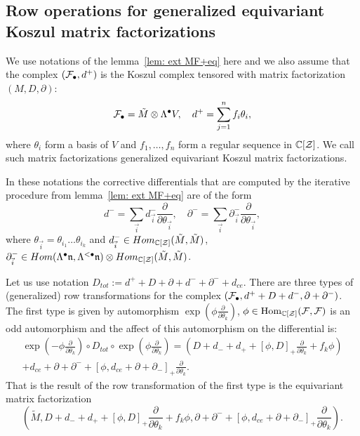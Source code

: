 \subsection{Row operations for generalized equivariant Koszul matrix factorizations}\label{ssec: row ops}
We use notations of the lemma~\ref{lem: ext MF+eq}
here and we also assume that the complex $(\mathcal{F}_\bullet,d^+)$ is the Koszul complex tensored with matrix factorization $(M,D,\partial)$:
$$\mathcal{F}_\bullet=\tilde{M} \otimes \Lambda^\bullet V, \quad d^+=\sum_{j=1}^n f_i\theta_i,$$
where $\theta_i$ form a basis of $V$ and $f_1,\dots,f_n$ form a regular sequence in $\mathbb{C}[\mathcal{Z}]$.
We call such matrix factorizations generalized equivariant Koszul matrix factorizations.

In these notations the corrective differentials that are computed by the iterative procedure from lemma~\ref{lem: ext MF+eq} are of the form
$$ d^-=\sum_{\vec{i}} d^-_{\vec{i}}\frac{\partial}{\partial \theta_{\vec{i}}}, \quad \partial^-=\sum_{\vec{i}}\partial^-_{\vec{i}} \frac{\partial}{\partial \theta_{\vec{i}}},$$
where $\theta_{\vec{i}}=\theta_{i_1}\dots \theta_{i_k}$ and $d^-_{\vec{i}}\in Hom_{\mathbb{C}[\mathcal{Z}]}(\tilde{M},\tilde{M})$,
$\partial_{\vec{i}}^-\in Hom(\Lambda^\bullet \mathfrak{n},\Lambda^{<\bullet}\mathfrak{n})\otimes Hom_{\mathbb{C}[\mathcal{Z}]}(\tilde{M},\tilde{M})$.

Let us use notation $D_{tot}:=d^++D+\partial+d^-+\partial^-+d_{ce}$.
There are three types of (generalized) row transformations for the complex $(\mathcal{F}_\bullet,d^++D+d^-,\partial+\partial^-)$. The first type is given by automorphism
 $\exp(\phi\frac{\partial}{\partial\theta_k})$, $\phi\in \mathop{{\rm Hom}}\nolimits_{\mathbb{C}[\mathcal{Z}]}(\mathcal{F},\mathcal{F})$ is an odd automorphism and the affect of this automorphism on the differential is:
 \begin{multline}
  \exp(-\phi\frac{\partial}{\partial \theta_k})\circ D_{tot}\circ \exp(\phi\frac{\partial}{\partial \theta_k})= \left(D+d_-+d_++[\phi,D]_+\frac{\partial}{\partial \theta_k}+f_k\phi\right)\\
 +d_{ce}+\partial+\partial^-+[\phi,d_{ce}+\partial+\partial_-]_+\frac{\partial}{\partial\theta_k}.
\end{multline}
That is the result of the row transformation of the first type is the equivariant matrix factorization
$$ (\tilde{M},D+d_-+d_++[\phi,D]_+\frac{\partial}{\partial \theta_k}+f_k\phi,\partial+\partial^-+[\phi,d_{ce}+\partial+\partial_-]_+\frac{\partial}{\partial\theta_k}).$$

